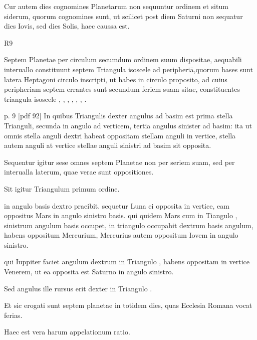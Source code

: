Cur autem dies cognomines Planetarum non sequuntur ordinem et
situm siderum, quorum cognomines sunt, ut scilicet post diem Saturni
non sequatur dies Iovis, sed dies Solis, haec caussa est.

\begin{wrapfigure}[9]{R}{9\baselineskip}
  \centering
  \def\svgwidth{9\baselineskip}
  {\astrofont}
\end{wrapfigure}

Septem Planetae
per circulum secumdum ordinem suum
dispositae, aequabili interuallo constituunt septem
Triangula isoscele ad peripheriā,quorum
bases sunt latera Heptagoni circulo inscripti,
ut habes in circulo proposito, ad cuius
peripheriam septem errantes sunt secundum
feriem suam sitae, constituentes triangula
isoscele , , ,
 , , , .

p. 9 [pdf 92]
%
In quibus Triangulis dexter angulus ad basim
est prima stella Trianguli, secunda in angulo ad verticem, tertia angulus
sinister ad basim: ita ut omnis stella anguli dextri habeat oppositam
stellam anguli in vertice, stella autem anguli at vertice stellae
anguli sinistri ad basim sit opposita.

Sequentur igitur sese omnes septem
Planetae non per seriem suam, sed per interualla laterum, quae
verae sunt oppositiones.

Sit igitur Triangulum  primum ordine.

 in angulo basis dextro praeibit. sequetur Luna ei opposita in vertice,
eam oppositus Mars in angulo sinistro basis. qui quidem Mars cum in
Tiangulo , sinistrum angulum basis occupet,
 in triangulo  occupabit
dextrum basis angulum, habens oppositum Mercurium,
Mercurius autem oppositum Iovem in angulo sinistro.

qui Iuppiter
faciet angulum dextrum in Triangulo , habens oppositam in vertice
Venerem, ut ea opposita est Saturno in angulo sinistro.

Sed angulus
ille rursus erit dexter in Triangulo .

Et sic erogati sunt septem
planetae in totidem dies, quas Ecclesia Romana vocat ferias.

Haec est vera harum appelationum ratio.


